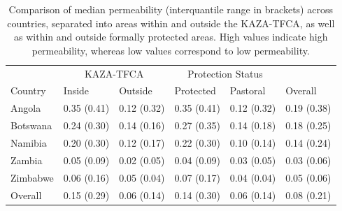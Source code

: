 \documentclass[abstract=on,10pt,a4paper,bibliography=totocnumbered]{article}
\begin{document}
\begin{table}[h]
  \begin{center}
  \caption{Comparison of median permeability (interquantile range in brackets)
  across countries, separated into areas within and outside the KAZA-TFCA, as
  well as within and outside formally protected areas. High values indicate high
  permeability, whereas low values correspond to low permeability.}
  \label{PermeabilityComp}
  \begin{tabular}{llllll}
    \toprule
    \multicolumn{1}{c}{} & \multicolumn{2}{c}{KAZA-TFCA} &
    \multicolumn{2}{c}{Protection Status} & \multicolumn{1}{c}{} \\
    \cmidrule(l{3pt}r{3pt}){2-3} \cmidrule(l{3pt}r{3pt}){4-5}
    Country & Inside & Outside & Protected & Pastoral & Overall\\
    \midrule
    Angola & 0.35 (0.41) & 0.12 (0.32) & 0.35 (0.41) & 0.12 (0.32) & 0.19 (0.38)\\
    Botswana & 0.24 (0.30) & 0.14 (0.16) & 0.27 (0.35) & 0.14 (0.18) & 0.18 (0.25)\\
    Namibia & 0.20 (0.30) & 0.12 (0.17) & 0.22 (0.30) & 0.10 (0.14) & 0.14 (0.24)\\
    Zambia & 0.05 (0.09) & 0.02 (0.05) & 0.04 (0.09) & 0.03 (0.05) & 0.03 (0.06)\\
    Zimbabwe & 0.06 (0.16) & 0.05 (0.04) & 0.07 (0.17) & 0.04 (0.04) & 0.05 (0.06)\\
    \hline
    Overall & 0.15 (0.29) & 0.06 (0.14) & 0.14 (0.30) & 0.06 (0.14) & 0.08 (0.21)\\
    \bottomrule
  \end{tabular}
  \end{center}
\end{table}
\end{document}
